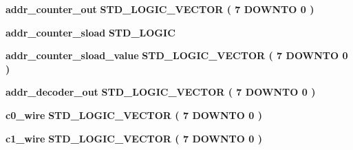 \begin{DoxyCompactItemize}
\item 
{\bf addr\+\_\+counter\+\_\+out} {\bfseries \textcolor{comment}{S\+T\+D\+\_\+\+L\+O\+G\+I\+C\+\_\+\+V\+E\+C\+T\+OR}\textcolor{vhdlchar}{ }\textcolor{vhdlchar}{(}\textcolor{vhdlchar}{ }\textcolor{vhdlchar}{ } \textcolor{vhdldigit}{7} \textcolor{vhdlchar}{ }\textcolor{keywordflow}{D\+O\+W\+N\+TO}\textcolor{vhdlchar}{ }\textcolor{vhdlchar}{ } \textcolor{vhdldigit}{0} \textcolor{vhdlchar}{ }\textcolor{vhdlchar}{)}\textcolor{vhdlchar}{ }} 
\item 
{\bf addr\+\_\+counter\+\_\+sload} {\bfseries \textcolor{comment}{S\+T\+D\+\_\+\+L\+O\+G\+IC}\textcolor{vhdlchar}{ }} 
\item 
{\bf addr\+\_\+counter\+\_\+sload\+\_\+value} {\bfseries \textcolor{comment}{S\+T\+D\+\_\+\+L\+O\+G\+I\+C\+\_\+\+V\+E\+C\+T\+OR}\textcolor{vhdlchar}{ }\textcolor{vhdlchar}{(}\textcolor{vhdlchar}{ }\textcolor{vhdlchar}{ } \textcolor{vhdldigit}{7} \textcolor{vhdlchar}{ }\textcolor{keywordflow}{D\+O\+W\+N\+TO}\textcolor{vhdlchar}{ }\textcolor{vhdlchar}{ } \textcolor{vhdldigit}{0} \textcolor{vhdlchar}{ }\textcolor{vhdlchar}{)}\textcolor{vhdlchar}{ }} 
\item 
{\bf addr\+\_\+decoder\+\_\+out} {\bfseries \textcolor{comment}{S\+T\+D\+\_\+\+L\+O\+G\+I\+C\+\_\+\+V\+E\+C\+T\+OR}\textcolor{vhdlchar}{ }\textcolor{vhdlchar}{(}\textcolor{vhdlchar}{ }\textcolor{vhdlchar}{ } \textcolor{vhdldigit}{7} \textcolor{vhdlchar}{ }\textcolor{keywordflow}{D\+O\+W\+N\+TO}\textcolor{vhdlchar}{ }\textcolor{vhdlchar}{ } \textcolor{vhdldigit}{0} \textcolor{vhdlchar}{ }\textcolor{vhdlchar}{)}\textcolor{vhdlchar}{ }} 
\item 
{\bf c0\+\_\+wire} {\bfseries \textcolor{comment}{S\+T\+D\+\_\+\+L\+O\+G\+I\+C\+\_\+\+V\+E\+C\+T\+OR}\textcolor{vhdlchar}{ }\textcolor{vhdlchar}{(}\textcolor{vhdlchar}{ }\textcolor{vhdlchar}{ } \textcolor{vhdldigit}{7} \textcolor{vhdlchar}{ }\textcolor{keywordflow}{D\+O\+W\+N\+TO}\textcolor{vhdlchar}{ }\textcolor{vhdlchar}{ } \textcolor{vhdldigit}{0} \textcolor{vhdlchar}{ }\textcolor{vhdlchar}{)}\textcolor{vhdlchar}{ }} 
\item 
{\bf c1\+\_\+wire} {\bfseries \textcolor{comment}{S\+T\+D\+\_\+\+L\+O\+G\+I\+C\+\_\+\+V\+E\+C\+T\+OR}\textcolor{vhdlchar}{ }\textcolor{vhdlchar}{(}\textcolor{vhdlchar}{ }\textcolor{vhdlchar}{ } \textcolor{vhdldigit}{7} \textcolor{vhdlchar}{ }\textcolor{keywordflow}{D\+O\+W\+N\+TO}\textcolor{vhdlchar}{ }\textcolor{vhdlchar}{ } \textcolor{vhdldigit}{0} \textcolor{vhdlchar}{ }\textcolor{vhdlchar}{)}\textcolor{vhdlchar}{ }} 
\item 

\end{DoxyCompactItemize}
